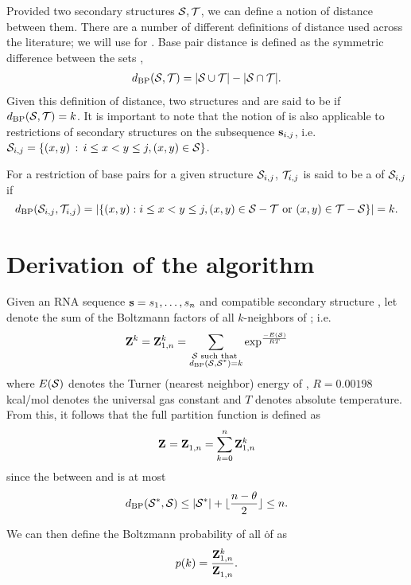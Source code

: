 Provided two secondary structures $\mathcal S,\mathcal T$, we can define a notion of
distance between them. There are a number of different definitions of distance
used across the literature; we will use {\em \bpd} for \fftbor.
Base pair distance is defined as the symmetric difference between the sets
\str,\strT
\begin{align}
\label{eq:fftbor:dBP}
\dBP{\str,\strT} = |\str \cup \strT| - |\str \cap \strT|.
\end{align}
Given this definition of distance, two structures \str and \strT are said to
be \kNbrs if $d_{\text{BP}}(\mathcal S,\mathcal T) = k$. It is important to note that
the notion of \bpd is also applicable to restrictions of secondary structures
on the subsequence ${\bf s}_{i,j}$,
i.e. $\mathcal S_{i,j} = \{ (x,y) \,:\, i \leq  x < y \leq j,  (x,y) \in \mathcal S \}$.

For a restriction of base pairs for a given structure $\mathcal S_{i,j}$,
$\mathcal T_{i,j}$ is said to be a \kNbr of $\mathcal S_{i,j}$ if
\[
d_{\text{BP}}(\mathcal S_{i,j},\mathcal T_{i,j}) = |\{ (x,y): i \leq x<y\leq j,
(x,y) \in \mathcal S - \mathcal T \mbox{ or } (x,y) \in \mathcal T - \mathcal S \}| = k.
\]

\section{Derivation of the \fftbor algorithm}
\label{sec:fftbor:math}

Given an RNA sequence ${\bf s}=s_1,\ldots,s_n$ and compatible secondary structure
\strSt, let  denote the sum of the Boltzmann factors
\boltzf{\str} of all $k$-neighbors \str of \strSt; i.e.
\[
{\bf Z}^{k}_{} = {\bf Z}^{k}_{1,n} =
\sum_{\substack{\mathcal S \text{ such that }\\ d_{\text{BP}}(\mathcal S,\mathcal S^*)=k}}
\exp^{\frac{-E(\mathcal S)}{RT}}
\]
where $E(\mathcal S)$ denotes the Turner (nearest neighbor)
energy \cite{}
of \str, $R = 0.00198$ kcal/mol denotes the universal
gas constant and $T$ denotes absolute temperature. From this, it follows that
the full partition function is defined as
\begin{align}
\label{eq:fftbor:partFunc}
\bfZ{}{} = \bfZ{}{1,n} = \sum_{k=0}^n \bfZ{k}{1,n}
\end{align}
since the \bpd between \strSt and \str is at most
\begin{align}
\label{eq:fftbor:maxDist}
\dBP{\strSt,\str} \leq |\strSt| + \lfloor \frac{n-\theta}{2} \rfloor \leq n.
\end{align}

We can then define the Boltzmann probability of all \kNbrs \. of \strSt as
\begin{align}
\label{eq:fftbor:probK}
p(k) =\frac{\bfZ{k}{1,n}}{\bfZ{}{1,n}}.
\end{align}

